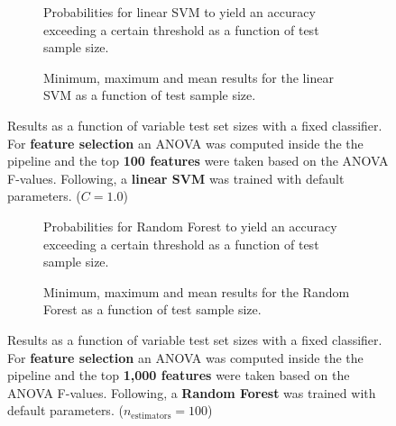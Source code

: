 \begin{figure}
    \captionsetup[subfigure]{justification=justified,singlelinecheck=false}
    \begin{subfigure}[t]{0.61\textwidth}
        
        \caption{Probabilities for linear SVM to yield an accuracy exceeding a certain threshold as a function of test sample size.}
    \end{subfigure}
    \hspace{3.0mm}
    \begin{subfigure}[t]{0.34\textwidth}
        
        \caption{Minimum, maximum and mean results for the linear SVM as a function of test sample size.}
    \end{subfigure}
    \caption[Effects of varying test sample size. Linear SVM; Preprocessing: ANOVA feature selection ($k_\text{best} = \num{100}$)]{Results as a function of variable test set sizes with a fixed classifier. For \textbf{feature selection} an ANOVA was computed inside the the pipeline and the top \textbf{100 features} were taken based on the ANOVA F-values. Following, a \textbf{{linear SVM}} was trained with default parameters. ($C=\num{1.0}$)}
    \label{fig:no_PCA_100_best_selected_LinearSVC}
\end{figure}

\begin{figure}
    \captionsetup[subfigure]{justification=justified,singlelinecheck=false}
    \begin{subfigure}[t]{0.61\textwidth}
        
        \caption{Probabilities for Random Forest to yield an accuracy exceeding a certain threshold as a function of test sample size.}
    \end{subfigure}
    \hspace{3.0mm}
    \begin{subfigure}[t]{0.34\textwidth}
        
        \caption{Minimum, maximum and mean results for the Random Forest as a function of test sample size.}
    \end{subfigure}
    \caption[Effects of varying test sample size. Random Forest; Preprocessing: ANOVA feature selection ($k_\text{best} = \num{1000}$)]{Results as a function of variable test set sizes with a fixed classifier. For \textbf{feature selection} an ANOVA was computed inside the the pipeline and the top \textbf{1,000 features} were taken based on the ANOVA F-values. Following, a \textbf{{Random Forest}} was trained with default parameters. ($n_\text{estimators}=\num{100}$)}
    \label{fig:no_PCA_1000_best_selected_RandomForest}
\end{figure}

